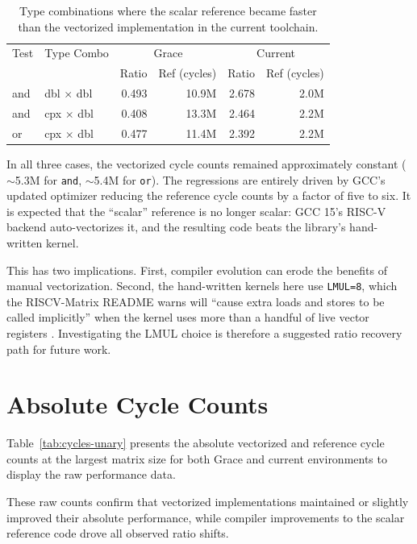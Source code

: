 \begin{table}[H]
\centering
\caption{Type combinations where the scalar reference became faster than the vectorized implementation in the current toolchain.}
\label{tab:regressions}
\small
\begin{tabular}{l l r r r r}
\toprule
Test & Type Combo & \multicolumn{2}{c}{Grace} & \multicolumn{2}{c}{Current} \\
 & & Ratio & Ref (cycles) & Ratio & Ref (cycles) \\
\midrule
and & dbl $\times$ dbl & 0.493 & 10.9M & 2.678 & 2.0M \\
and & cpx $\times$ dbl & 0.408 & 13.3M & 2.464 & 2.2M \\
or & cpx $\times$ dbl & 0.477 & 11.4M & 2.392 & 2.2M \\
\bottomrule
\end{tabular}
\end{table}

In all three cases, the vectorized cycle counts remained approximately constant ($\sim$5.3M for \texttt{and}, $\sim$5.4M for \texttt{or}). The regressions are entirely driven by GCC's updated optimizer reducing the reference cycle counts by a factor of five to six. It is expected that the ``scalar'' reference is no longer scalar: GCC 15's RISC-V backend auto-vectorizes it, and the resulting code beats the library's hand-written kernel.

This has two implications. First, compiler evolution can erode the benefits of manual vectorization. Second, the hand-written kernels here use \texttt{LMUL=8}, which the RISCV-Matrix README warns will ``cause extra loads and stores to be called implicitly'' when the kernel uses more than a handful of live vector registers \cite{riscvmatrix}. Investigating the LMUL choice is therefore a suggested ratio recovery path for future work.

\section{Absolute Cycle Counts}

Table~\ref{tab:cycles-unary} presents the absolute vectorized and reference cycle counts at the largest matrix size for both Grace and current environments to display the raw performance data.



These raw counts confirm that vectorized implementations maintained or slightly improved their absolute performance, while compiler improvements to the scalar reference code drove all observed ratio shifts.

